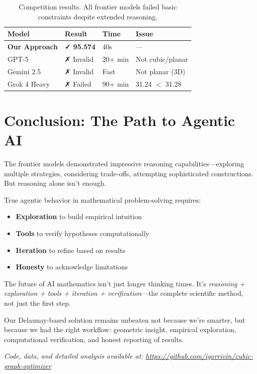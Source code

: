 \documentclass[11pt]{article}
\begin{document}
\begin{table}[h]
\centering
\begin{tabular}{llll}
\toprule
\textbf{Model} & \textbf{Result} & \textbf{Time} & \textbf{Issue} \\
\midrule
\textbf{Our Approach} & \textbf{✓ 95.574} & 40s & --- \\
GPT-5 & ✗ Invalid & 20+ min & Not cubic/planar \\
Gemini 2.5 & ✗ Invalid & Fast & Not planar (3D) \\
Grok 4 Heavy & ✗ Failed & 90+ min & 31.24 $<$ 31.28 \\
\bottomrule
\end{tabular}
\caption{Competition results. All frontier models failed basic constraints despite extended reasoning.}
\end{table}

\section{Conclusion: The Path to Agentic AI}

The frontier models demonstrated impressive reasoning capabilities---exploring multiple strategies, considering trade-offs, attempting sophisticated constructions. But reasoning alone isn't enough.

True agentic behavior in mathematical problem-solving requires:
\begin{itemize}
\item \textbf{Exploration} to build empirical intuition
\item \textbf{Tools} to verify hypotheses computationally
\item \textbf{Iteration} to refine based on results
\item \textbf{Honesty} to acknowledge limitations
\end{itemize}

The future of AI mathematics isn't just longer thinking times. It's \textit{reasoning + exploration + tools + iteration + verification}---the complete scientific method, not just the first step.

Our Delaunay-based solution remains unbeaten not because we're smarter, but because we had the right workflow: geometric insight, empirical exploration, computational verification, and honest reporting of results.

\vspace{1cm}

\noindent\textit{Code, data, and detailed analysis available at: \url{https://github.com/igorrivin/cubic-graph-optimizer}}
\end{document}
